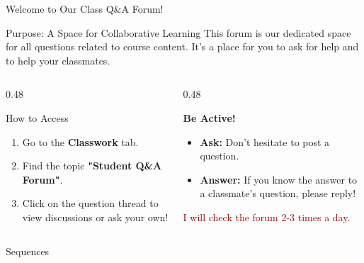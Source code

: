 \documentclass[10pt]{beamer}
\begin{document}
\begin{frame}{Welcome to Our Class Q\&A Forum!}
    \begin{block}{Purpose: A Space for Collaborative Learning}
        This forum is our dedicated space for all questions related to course content. It's a place for you to ask for help and to help your classmates. 
    \end{block}

    \begin{columns}[T] %
        \begin{column}{0.48\textwidth}
            \begin{block}{How to Access}
                \begin{enumerate}
                    \item Go to the \textbf{Classwork} tab.
                    \item Find the topic \textbf{"Student Q\&A Forum"}.
                    \item Click on the question thread to view discussions or ask your own!
                \end{enumerate}
            \end{block}
        \end{column}
        \begin{column}{0.48\textwidth}
            \begin{block}{}
                \textbf{Be Active!}
                \begin{itemize}
                    \item \textbf{Ask:} Don't hesitate to post a question.
                    \item \textbf{Answer:} If you know the answer to a classmate's question, please reply! 
                \end{itemize}
\textcolor{DarkRed}{I will check the forum 2-3 times a day. }
            \end{block}
        \end{column}
    \end{columns}
\end{frame}



\begin{frame}{}
	\begin{center}
		\alert{\Huge Sequences}
	\end{center}
\end{frame}
\end{document}
